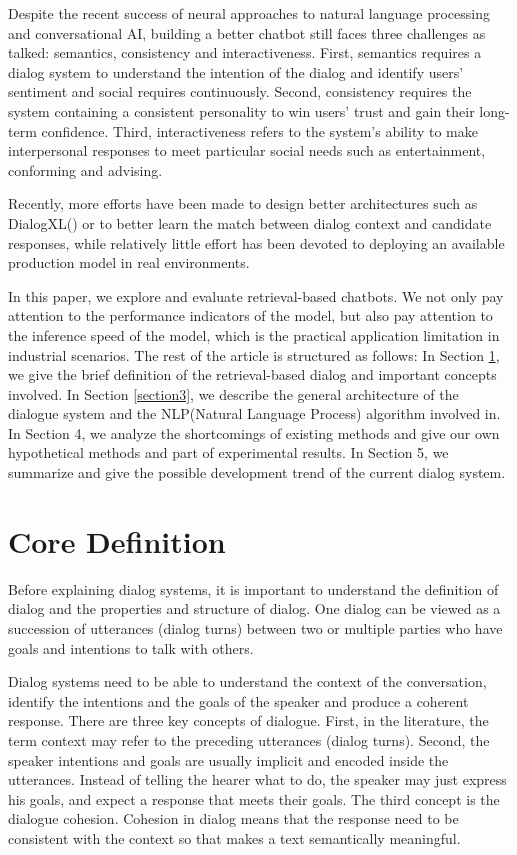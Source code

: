 \documentclass{article}
\begin{document}
Despite the recent success of neural approaches to natural language processing and conversational AI, building a better chatbot still faces three challenges as \cite{huang2020challenges} talked: semantics, consistency and interactiveness. First, semantics requires a dialog system to understand the intention of the dialog and identify users’ sentiment and social requires continuously. Second, consistency requires the system containing a consistent personality to win users’ trust and gain their long-term confidence. Third, interactiveness refers to the system’s ability to make interpersonal responses to meet particular social needs such as entertainment, conforming and advising. \par

Recently, more efforts have been made to design better architectures such as DialogXL(\cite{shen2020dialogxl}) or to better learn the match between dialog context and candidate responses, while relatively little effort has been devoted to deploying an available production model in real environments. \par 

In this paper, we explore and evaluate retrieval-based chatbots. We not only pay attention to the performance indicators of the model, but also pay attention to the inference speed of the model, which is the practical application limitation in industrial scenarios. The rest of the article is structured as follows: In Section \ref{section2}, we give the brief definition of the retrieval-based dialog and important concepts involved. In Section \ref{section3}, we describe the general architecture of the dialogue system and the NLP(Natural Language Process) algorithm involved in. In Section 4, we analyze the shortcomings of existing methods and give our own hypothetical methods and part of experimental results. In Section 5, we summarize and give the possible development trend of the current dialog system.

\section{Core Definition}
\label{section2}

Before explaining dialog systems, it is important to understand the definition of dialog and the properties and structure of dialog. One dialog can be viewed as a succession of utterances (dialog turns) between two or multiple parties who have goals and intentions to talk with others.

Dialog systems need to be able to understand the context of the conversation, identify the intentions and the goals of the speaker and produce a coherent response. There are three key concepts of dialogue. First, in the literature, the term context may refer to the preceding utterances (dialog turns). Second, the speaker intentions and goals are usually implicit and encoded inside the utterances. Instead of telling the hearer what to do, the speaker may just express his goals, and expect a response that meets their goals. The third concept is the dialogue cohesion. Cohesion in dialog means that the response need to be consistent with the context so that makes a text semantically meaningful.
\end{document}
